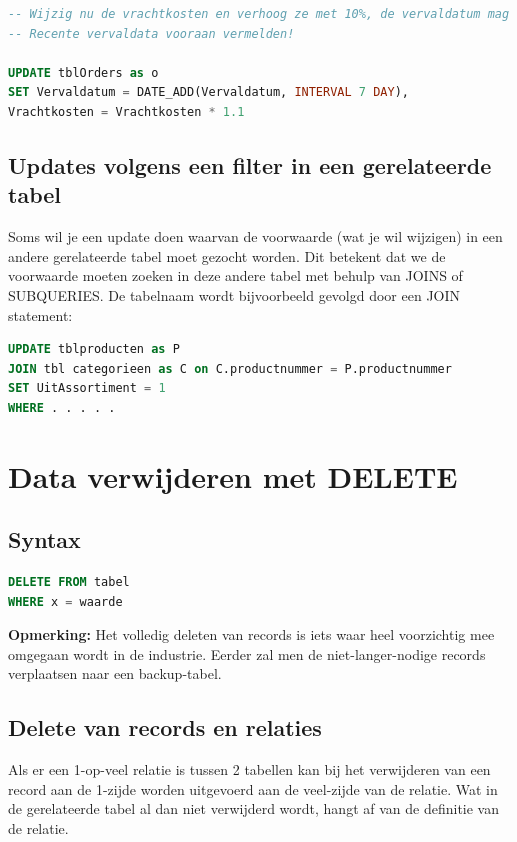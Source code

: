\documentclass{article}
\newcommand{\bold}[1]{\textbf{#1}}
\begin{document}
\begin{lstlisting}[language=SQL]
-- Wijzig nu de vrachtkosten en verhoog ze met 10%, de vervaldatum mag 7 dagen later worden. 
-- Recente vervaldata vooraan vermelden!

UPDATE tblOrders as o
SET Vervaldatum = DATE_ADD(Vervaldatum, INTERVAL 7 DAY),
Vrachtkosten = Vrachtkosten * 1.1

\end{lstlisting} 

\subsection{Updates volgens een filter in een gerelateerde tabel}
Soms wil je een update doen waarvan de voorwaarde (wat je wil wijzigen) in een andere gerelateerde tabel moet gezocht worden. 
Dit betekent dat we de voorwaarde moeten zoeken in deze andere tabel met behulp van JOINS of SUBQUERIES. 
De tabelnaam wordt bijvoorbeeld gevolgd door een JOIN statement:

\begin{lstlisting}[language=SQL]
UPDATE tblproducten as P 
JOIN tbl categorieen as C on C.productnummer = P.productnummer 
SET UitAssortiment = 1
WHERE . . . . .     
\end{lstlisting}

\section{Data verwijderen met DELETE}
\subsection{Syntax}

\begin{lstlisting}[language=SQL]
DELETE FROM tabel
WHERE x = waarde
\end{lstlisting}

\bold{Opmerking:} Het volledig deleten van records is iets waar heel voorzichtig mee omgegaan wordt in de industrie.
Eerder zal men de niet-langer-nodige records verplaatsen naar een backup-tabel.

\subsection{Delete van records en relaties}
Als er een 1-op-veel relatie is tussen 2 tabellen kan bij het verwijderen van een record aan de 1-zijde worden uitgevoerd aan de veel-zijde van de relatie.
Wat in de gerelateerde tabel al dan niet verwijderd wordt, hangt af van de definitie van de relatie.
\end{document}
